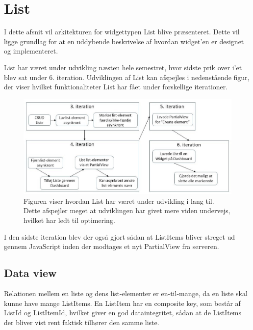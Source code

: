 \section{List}

I dette afsnit vil arkitekturen for widgettypen List blive præsenteret. Dette vil ligge grundlag for at en uddybende beskrivelse af hvordan widget'en er designet og implementeret.

List har været under udvikling næsten hele semestret, hvor sidste prik over i'et blev sat under 6. iteration. Udviklingen af List kan afspejles i nedenstående figur, der viser hvilket funktionaliteter List har fået under forskellige iterationer.

\begin{figure}[H]
    \includegraphics[width=\linewidth]{09_Arkitektur/Lists/Images/Iterationer.jpg}
    \caption{Figuren viser hvordan List har været under udvikling i lang til. Dette afspejler meget at udviklingen har givet mere viden undervejs, hvilket har ledt til optimering.}
    \label{fig:ListIterationer}
\end{figure}

I den sidste iteration blev der også gjort sådan at ListItems bliver streget ud gennem JavaScript inden der modtages et nyt PartialView fra serveren.

\subsection{Data view}

Relationen mellem en liste og dens list-elementer er en-til-mange, da en liste skal kunne have mange ListItems. En ListItem har en composite key, som består af ListId og ListItemId, hvilket giver en god dataintegritet, sådan at de ListItems der bliver vist rent faktisk tilhører den samme liste.

